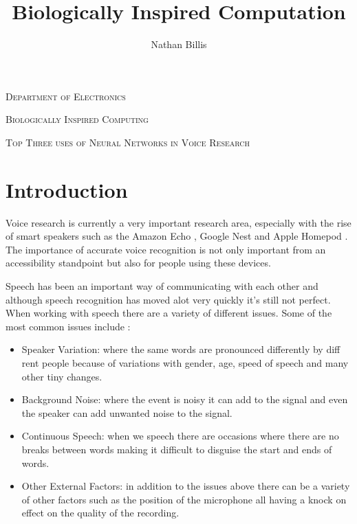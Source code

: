 \documentclass[11pt]{article}
\title{ 
    Biologically Inspired Computation
}
\author{Nathan Billis}
\begin{document}
\begin{titlepage}
    \centering
    {\scshape\LARGE Department of Electronics \par}
    \vspace{1cm}
    {\scshape\Large Biologically Inspired Computing \par}
    \vspace{1cm}
    {\scshape\Large Top Three uses of Neural Networks in Voice Research \par}
    \vfill
    {\Large\itshape \@author \par}
    \vspace{2cm}
    
    \tableofcontents

\end{titlepage}

	
\newpage

    \section{Introduction}
    
    Voice research is currently a very important research area, especially with the rise of smart speakers such as the Amazon Echo \cite{IntroducingRoom}, Google Nest \cite{GoogleStore} and Apple Homepod \cite{HomePodUK}. The importance of accurate voice recognition is not only important from an accessibility standpoint but also for people using these devices. 
    
    Speech has been an important way of communicating with each other and although speech recognition has moved alot very quickly it's still not perfect. When working with speech there are a variety of different issues. Some of the most common issues include \cite{Gevaert2010NeuralRecognition}: 
    \begin{itemize}
        \item Speaker Variation: where the same words are pronounced differently by diff rent people because of variations with gender, age, speed of speech and many other tiny changes.
        \item Background Noise: where the event is noisy it can add to the signal and even the speaker can add unwanted noise to the signal.
        \item Continuous Speech: when we speech there are occasions where there are no breaks between words making it difficult to disguise the start and ends of words.
        \item Other External Factors: in addition to the issues above there can be a variety of other factors such as the position of the microphone all having a knock on effect on the quality of the recording.
    \end{itemize}
    
\end{document}
